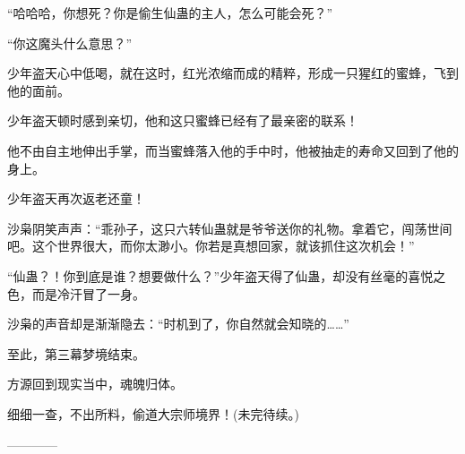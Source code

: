 \begin{this_body}
“哈哈哈，你想死？你是偷生仙蛊的主人，怎么可能会死？”

“你这魔头什么意思？”

少年盗天心中低喝，就在这时，红光浓缩而成的精粹，形成一只猩红的蜜蜂，飞到他的面前。

少年盗天顿时感到亲切，他和这只蜜蜂已经有了最亲密的联系！

他不由自主地伸出手掌，而当蜜蜂落入他的手中时，他被抽走的寿命又回到了他的身上。

少年盗天再次返老还童！

沙枭阴笑声声：“乖孙子，这只六转仙蛊就是爷爷送你的礼物。拿着它，闯荡世间吧。这个世界很大，而你太渺小。你若是真想回家，就该抓住这次机会！”

“仙蛊？！你到底是谁？想要做什么？”少年盗天得了仙蛊，却没有丝毫的喜悦之色，而是冷汗冒了一身。

沙枭的声音却是渐渐隐去：“时机到了，你自然就会知晓的……”

至此，第三幕梦境结束。

方源回到现实当中，魂魄归体。

细细一查，不出所料，偷道大宗师境界！(未完待续。)

------------

\end{this_body}


